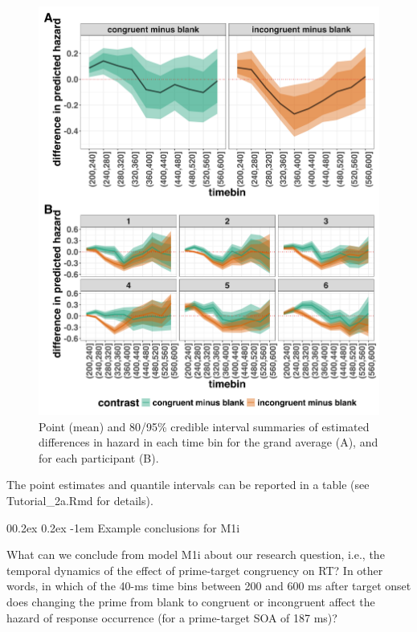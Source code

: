 \documentclass[
  man, donotrepeattitle,floatsintext]{apa6}
\makeatletter
\let\oldparagraph\paragraph
\renewcommand{\paragraph}[1]{\oldparagraph{#1}\mbox{}}
\renewcommand{\paragraph}{\@startsection{paragraph}{4}{\parindent}%
  {0\baselineskip \@plus 0.2ex \@minus 0.2ex}%
  {-1em}%
  {\normalfont\normalsize\bfseries\itshape\typesectitle}}
\makeatother
\begin{document}
\begin{figure}[H]

{\centering \includegraphics[width=0.8\linewidth,height=0.67\textheight,]{../Tutorial_2_Bayesian/figures/M1i_ame_combined} 

}

\caption{Point (mean) and 80/95\% credible interval summaries of estimated differences in hazard in each time bin for the grand average (A), and for each participant (B).}\label{fig:plot-grand-ame-effects}
\end{figure}

The point estimates and quantile intervals can be reported in a table (see Tutorial\_2a.Rmd for details).

\paragraph{Example conclusions for M1i}\label{example-conclusions-for-m1i}

What can we conclude from model M1i about our research question, i.e., the temporal dynamics of the effect of prime-target congruency on RT? In other words, in which of the 40-ms time bins between 200 and 600 ms after target onset does changing the prime from blank to congruent or incongruent affect the hazard of response occurrence (for a prime-target SOA of 187 ms)?
\end{document}
